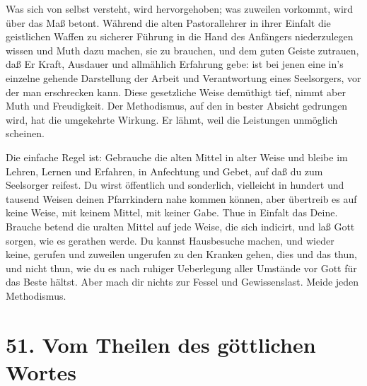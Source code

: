 Was sich von selbst versteht, wird hervorgehoben; was zuweilen vorkommt, wird über das Maß betont. Während die alten Pastorallehrer in ihrer Einfalt die geistlichen Waffen zu sicherer Führung in die Hand des Anfängers niederzulegen wissen und Muth dazu machen, sie zu brauchen, und dem guten Geiste zutrauen, daß Er Kraft, Ausdauer und allmählich Erfahrung gebe: ist bei jenen eine in’s einzelne gehende Darstellung der Arbeit und Verantwortung eines Seelsorgers, vor der man erschrecken kann. Diese gesetzliche Weise demüthigt tief, nimmt aber Muth und Freudigkeit. Der Methodismus, auf den in bester Absicht gedrungen wird, hat die umgekehrte Wirkung. Er lähmt, weil die Leistungen unmöglich scheinen.

Die einfache Regel ist: Gebrauche die alten Mittel in alter Weise und bleibe im Lehren, Lernen und Erfahren, in Anfechtung und Gebet, auf daß du zum Seelsorger reifest. Du wirst öffentlich und sonderlich, vielleicht in hundert und tausend Weisen deinen Pfarrkindern nahe kommen können, aber übertreib es auf keine Weise, mit keinem Mittel, mit keiner Gabe. Thue in Einfalt das Deine. Brauche betend die uralten Mittel auf jede Weise, die sich indicirt, und laß Gott sorgen, wie es gerathen werde. Du kannst Hausbesuche machen, und wieder keine, gerufen und zuweilen ungerufen zu den Kranken gehen, dies und das thun, und nicht thun, wie du es nach ruhiger Ueberlegung aller Umstände vor Gott für das Beste hältst. Aber mach dir nichts zur Fessel und Gewissenslast. Meide jeden Methodismus.

\section{51. Vom Theilen des göttlichen Wortes}

